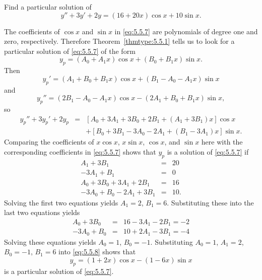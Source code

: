 \documentclass{ximera}
\begin{document}
\begin{example}\label{example:5.5.3}
Find a particular solution of
\begin{equation} \label{eq:5.5.7}
y''+3y'+2y=(16+20x)\cos x+10\sin x.
\end{equation}

\begin{explanation}
The coefficients of $\cos x$ and $\sin x$ in \eqref{eq:5.5.7} are
polynomials of degree one and zero, respectively. Therefore
Theorem~\ref{thmtype:5.5.1} tells us to look for a particular solution of
\eqref{eq:5.5.7} of the form
\begin{equation} \label{eq:5.5.8}
y_p=(A_0+A_1x)\cos x+(B_0+B_1x)\sin x.
\end{equation}
Then
\begin{equation} \label{eq:5.5.9}
y_p'=(A_1+B_0+B_1x)\cos x+(B_1-A_0-A_1x)\sin x
\end{equation}
and
\begin{equation} \label{eq:5.5.10}
 y_p''=(2B_1-A_0-A_1x)\cos x-(2A_1+B_0+B_1x)\sin x,
\end{equation}
so
\begin{equation} \label{eq:5.5.11}
\begin{array}{rcl}
y_p''+3y_p'+2y_p&=&\left[A_0+3 A_1+3 B_0+2 B_1+(A_1+3 B_1)x\right]\cos
x\\ &&+ \left[B_0+3 B_1-3 A_0-2 A_1+(B_1-3 A_1)x\right]\sin x.
\end{array}
\end{equation}
Comparing the coefficients of $x\cos x$, $x\sin x$, $\cos x$, and
$\sin x$ here with the corresponding coefficients in \eqref{eq:5.5.7}
shows that $y_p$ is a solution of \eqref{eq:5.5.7} if
$$
\begin{array}{rcr}
A_1+3B_1&=&20\\
-3A_1+B_1&=&0\\
A_0+3B_0+3A_1+2B_1&=&16\\
-3A_0+B_0-2A_1+3B_1&=&10.
\end{array}
$$
Solving the first two equations yields $A_1=2$, $B_1=6$.
Substituting these into the last two equations  yields
\begin{eqnarray*}
A_0+3B_0&=&16-3A_1-2B_1=-2\\
-3A_0+B_0&=&10+2A_1-3B_1=-4
 \end{eqnarray*}
Solving these equations yields $A_0=1$, $B_0=-1$.
Substituting $A_0=1$, $A_1=2$, $B_0=-1$, $B_1=6$ into
\eqref{eq:5.5.8} shows that
$$
y_p=(1+2x)\cos x-(1-6x)\sin x
$$
is a particular solution of  \eqref{eq:5.5.7}.
\end{explanation}
\end{example}
\end{document}
